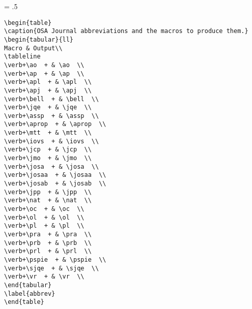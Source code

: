 \baselineskip = .5\baselineskip  %
\begin{verbatim}
\begin{table}
\caption{OSA Journal abbreviations and the macros to produce them.}
\begin{tabular}{ll}
Macro & Output\\
\tableline
\verb+\ao  + & \ao  \\
\verb+\ap  + & \ap  \\
\verb+\apl  + & \apl  \\
\verb+\apj  + & \apj  \\
\verb+\bell  + & \bell  \\
\verb+\jqe  + & \jqe  \\
\verb+\assp  + & \assp  \\
\verb+\aprop  + & \aprop  \\
\verb+\mtt  + & \mtt  \\
\verb+\iovs  + & \iovs  \\
\verb+\jcp  + & \jcp  \\
\verb+\jmo  + & \jmo  \\
\verb+\josa  + & \josa  \\
\verb+\josaa  + & \josaa  \\
\verb+\josab  + & \josab  \\
\verb+\jpp  + & \jpp  \\
\verb+\nat  + & \nat  \\
\verb+\oc  + & \oc  \\
\verb+\ol  + & \ol  \\
\verb+\pl  + & \pl  \\
\verb+\pra  + & \pra  \\
\verb+\prb  + & \prb  \\
\verb+\prl  + & \prl  \\
\verb+\pspie  + & \pspie  \\
\verb+\sjqe  + & \sjqe  \\
\verb+\vr  + & \vr  \\
\end{tabular}
\label{abbrev}
\end{table}


\end{verbatim}


